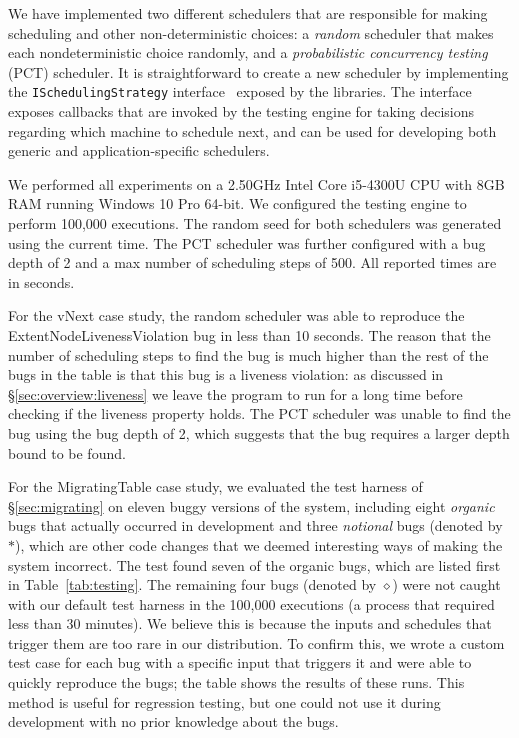 We have implemented two different schedulers that are responsible for making scheduling and other non-deterministic choices: a \emph{random} scheduler that makes each nondeterministic choice randomly, and a \emph{probabilistic concurrency testing}~\cite{burckhardt2010pct} (PCT) scheduler. It is straightforward to create a new scheduler by implementing the \texttt{ISchedulingStrategy} interface~\cite{desai2015systematic} exposed by the \psharp libraries. The interface exposes callbacks that are invoked by the \psharp testing engine for taking decisions regarding which machine to schedule next, and can be used for developing both generic and application-specific schedulers.




We performed all experiments on a 2.50GHz Intel Core i5-4300U CPU with 8GB RAM running Windows 10 Pro 64-bit. We configured the \psharp testing engine to perform 100,000 executions. The random seed for both schedulers was generated using the current time. The PCT scheduler was further configured with a bug depth of 2 and a max number of scheduling steps of 500. All reported times are in seconds.

For the vNext case study, the random scheduler was able to reproduce the ExtentNodeLivenessViolation bug in less than 10 seconds. The reason that the number of scheduling steps to find the bug is much higher than the rest of the bugs in the table is that this bug is a liveness violation: as discussed in \S\ref{sec:overview:liveness} we leave the program to run for a long time before checking if the liveness property holds. The PCT scheduler was unable to find the bug using the bug depth of 2, which suggests that the bug requires a larger depth bound to be found.

For the MigratingTable case study, we evaluated the \psharp test harness of \S\ref{sec:migrating} on eleven buggy versions of the system, including eight \emph{organic} bugs that actually occurred in development and three \emph{notional} bugs (denoted by $*$), which are other code changes that we deemed interesting ways of making the system incorrect. The test found seven of the organic bugs, which are listed first in Table~\ref{tab:testing}. The remaining four bugs (denoted by $\diamond$) were not caught with our default test harness in the 100,000 executions (a process that required less than 30 minutes). We believe this is because the inputs and schedules that trigger them are too rare in our distribution. To confirm this, we wrote a custom test case for each bug with a specific input that triggers it and were able to quickly reproduce the bugs;
the table shows the results of these runs.
This method is useful for regression testing, but one could not use it during development with no prior knowledge about the bugs.

